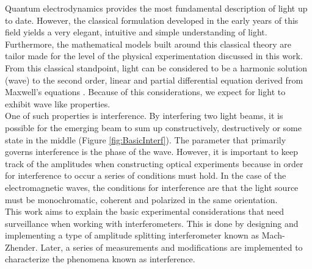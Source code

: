 \label{sec:INTRO}
Quantum electrodynamics provides the most fundamental description of light up to date. However, the classical formulation developed in the early years of this field yields a very elegant, intuitive and simple understanding of light. Furthermore, the mathematical models built around this classical theory are tailor made for the level of the physical experimentation discussed in this work. From this classical standpoint, light can be considered to be a harmonic solution (wave) to the second order, linear and partial differential equation derived from Maxwell's equations \cite{maxwell1954electricity}. Because of this considerations, we expect for light to exhibit wave like properties. \\

One of such properties is interference. By interfering two light beams, it is possible for the emerging beam to sum up constructively, destructively or some state in the middle (Figure \ref{fig:BasicInterf}). The parameter that primarily governs interference is the phase of the wave. However, it is important to keep track of the amplitudes when constructing optical experiments because in order for interference to occur a series of conditions must hold.  In the case of the electromagnetic waves, the conditions for interference are that the light source must be monochromatic, coherent and polarized in the same orientation. \\

This work aims to explain the basic experimental considerations that need surveillance when working with interferometers. This is done by designing and implementing a type of amplitude splitting interferometer known as Mach-Zhender. Later, a series of measurements and modifications are implemented to characterize the phenomena known as interference.



